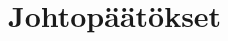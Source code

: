 \documentclass[utf8,bachelor,finnish]{bachelor}
\begin{document}
  
  \chapter{Johtopäätökset}




\printbibliography
\end{document}
